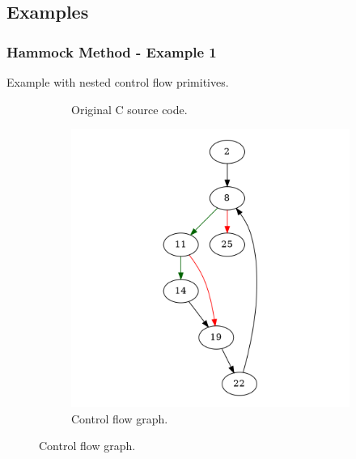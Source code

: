 
\subsection{Examples}
\label{app:examples}



\subsubsection{Hammock Method - Example 1}
\label{app:hammock_example1}

Example with nested control flow primitives.

\begin{figure}[htbp]
	\centering
	\begin{subfigure}[b]{0.48\textwidth}
		\centering
		
		\caption{Original C source code.}
	\end{subfigure}
	\begin{subfigure}[b]{0.50\textwidth}
		\centering
		\includegraphics[width=\textwidth]{inc/appendices/examples/hammock/example/without-break/main.png}
		\caption{Control flow graph.}
	\end{subfigure}
\end{figure}

